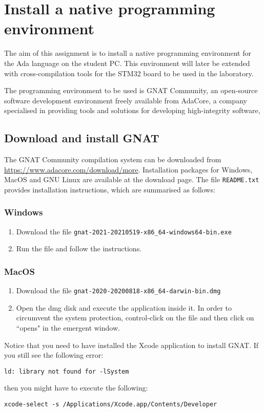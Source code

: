 \chapter{Install a native programming environment}\label{ch:Assignment1}

The aim of this assignment is to install a native programming environment for the Ada language on the student PC. This environment will later be extended with cross-compilation tools for the STM32 board to be used in the laboratory. 

The programming environment to be used is GNAT Community, an open-source software development environment freely available from AdaCore, a company specialised in providing tools and solutions for developing high-integrity software,
\section{Download and install GNAT}
The GNAT Community compilation system can be downloaded from \url{https://www.adacore.com/download/more}. Installation packages for Windows, MacOS and GNU Linux are available at the download page. The file {\tt README.txt} provides installation instructions, which are summarised as follows:
\subsection{Windows}
\begin{enumerate}
\item Download the file {\tt gnat-2021-20210519-x86\_64-windows64-bin.exe}
\item Run the file and follow the instructions.
\end{enumerate}
\subsection{MacOS}
\begin{enumerate}
\item Download the file {\tt gnat-2020-20200818-x86\_64-darwin-bin.dmg}
\item Open the dmg disk and execute the application inside it. In order to circumvent the system protection, control-click on the file and then click on ``opens" in the emergent window.
\end{enumerate}
Notice that you need to have installed the Xcode application to install GNAT. If you still see the following error:
\begin{verbatim}
ld: library not found for -lSystem
\end{verbatim}
then you might have to execute the following:
\begin{verbatim}
xcode-select -s /Applications/Xcode.app/Contents/Developer
\end{verbatim}
